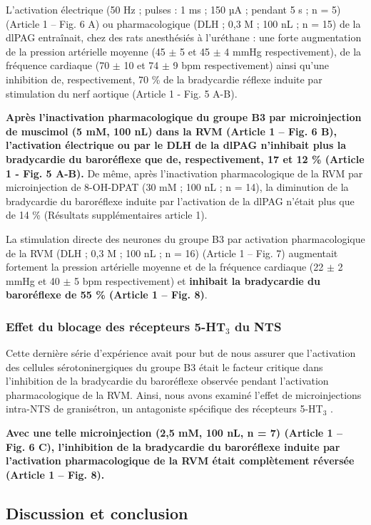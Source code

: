 \documentclass[a4paper,12pt,twoside]{report}
\begin{document}
L’activation électrique (50 Hz ; pulses : 1 ms ; 150 µA ; pendant 5 s ; n = 5) (Article 1 – Fig. 6 A) ou pharmacologique (DLH ; 0,3 M ; 100 nL ; n = 15) de la dlPAG entraînait, chez des rats anesthésiés à l’uréthane : une forte augmentation de la pression artérielle moyenne (45 $\pm$ 5 et 45 $\pm$ 4 mmHg respectivement), de la fréquence cardiaque (70 $\pm$ 10 et 74 $\pm$ 9 bpm respectivement) ainsi qu’une inhibition de, respectivement, 70 \% de la bradycardie réflexe induite par stimulation du nerf aortique (Article 1 - Fig. 5 A-B).

\textbf{Après l’inactivation pharmacologique du groupe B3 par microinjection de muscimol (5 mM, 100 nL) dans la RVM (Article 1 – Fig. 6 B), l’activation électrique ou par le DLH de la dlPAG n’inhibait plus la bradycardie du baroréflexe que de, respectivement, 17 et 12 \% (Article 1 - Fig. 5 A-B).} De même, après l’inactivation pharmacologique de la RVM par microinjection de 8-OH-DPAT (30 mM ; 100 nL ; n = 14), la diminution de la bradycardie du baroréflexe induite par l’activation de la dlPAG n’était plus que de 14 \% (Résultats supplémentaires article 1). 

La stimulation directe des neurones du groupe B3 par activation pharmacologique de la RVM (DLH ; 0,3 M ; 100 nL ; n = 16) (Article 1 – Fig. 7) augmentait fortement la pression artérielle moyenne et de la fréquence cardiaque (22 $\pm$ 2 mmHg et 40 $\pm$ 5 bpm respectivement) et \textbf{inhibait la bradycardie du baroréflexe de 55 \% (Article 1 – Fig. 8)}. 

\subsubsection{Effet du blocage des récepteurs 5-HT$_{3}$ du NTS}

Cette dernière série d'expérience avait pour but de nous assurer que l’activation des cellules sérotoninergiques du groupe B3 était le facteur critique dans l'inhibition de la bradycardie du baroréflexe observée pendant l’activation pharmacologique de la RVM. Ainsi, nous avons examiné l'effet de microinjections intra-NTS de granisétron, un antagoniste spécifique des récepteurs 5-HT$_{3}$ .

\textbf{Avec une telle microinjection (2,5 mM, 100 nL, n = 7) (Article 1 – Fig. 6 C), l’inhibition de la bradycardie du baroréflexe induite par l’activation pharmacologique de la RVM était complètement réversée (Article 1 – Fig. 8).} 

\subsection{Discussion et conclusion}
\end{document}

